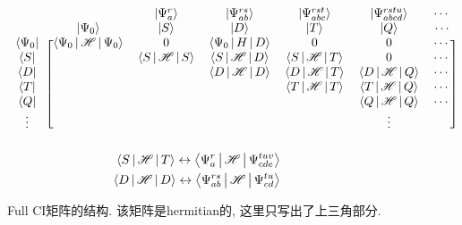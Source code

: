 \begin{figure}[H]
	\[
	\begin{blockarray}{*{7}{c}}
	                 &                            & \ket{\Psi_a^r}   & \ket{\Psi_{ab}^{rs}} &\ket{\Psi_{abc}^{rst}} & \ket{\Psi_{abcd}^{rstu}} &\cdots\\
	                 &\ket{\Psi_0}                & \ket{S}          & \ket{D}              &\ket{T}                & \ket{Q}                  &{\cdots}\\
	\begin{block}{c[cccccc]}
		\bra{\Psi_0} & \braket{\Psi_0|\hs|\Psi_0} & 0                & \braket{\Psi_0|H|D}  & 0                     & 0                        & \cdots \\
		  \bra{S}    &                            & \braket{S|\hs|S} & \braket{S|\hs|D}     & \braket{S|\hs|T}      & 0                        & \cdots \\
		  \bra{D}    &                            &                  & \braket{D|\hs|D}     & \braket{D|\hs|T}      & \braket{D|\hs|Q}         & \cdots \\
		  \bra{T}    &                            &                  &                      & \braket{T|\hs|T}      & \braket{T|\hs|Q}         & \cdots \\
		  \bra{Q}    &                            &                  &                      &                       & \braket{Q|\hs|Q}         & \cdots \\
		  {\vdots}   &                            &                  &                      &                       & \vdots                   & \\
	\end{block}	
	\end{blockarray}
	\]
	\vspace{-40pt}
	\begin{align*}
	\Braket{S|\mathscr{H}|T} \leftrightarrow \Braket{\Psi_a^r|\mathscr{H}|\Psi_{cde}^{tuv}}\\
	\Braket{D|\mathscr{H}|D} \leftrightarrow \Braket{\Psi_{ab}^{rs}|\mathscr{H}|\Psi_{cd}^{tu}}\\
	\end{align*}
	\vspace{-30pt}
	\caption{Full CI矩阵的结构. 该矩阵是hermitian的, 这里只写出了上三角部分.}
	\label{f4.1}
\end{figure}

